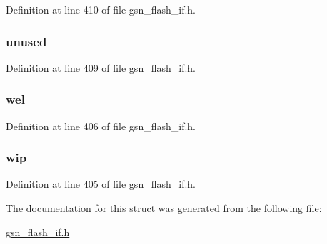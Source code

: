 Definition at line 410 of file gsn\_\-flash\_\-if.h.

\hypertarget{a00081_a2c3ace150ddcb10d297a6d30b67d6330}{
\subsubsection[{unused}]{ {\bf unused}}}
\label{a00081_a2c3ace150ddcb10d297a6d30b67d6330}


Definition at line 409 of file gsn\_\-flash\_\-if.h.

\hypertarget{a00081_a9373c12ea65b0c6a95c219ecd87449ce}{
\subsubsection[{wel}]{ {\bf wel}}}
\label{a00081_a9373c12ea65b0c6a95c219ecd87449ce}


Definition at line 406 of file gsn\_\-flash\_\-if.h.

\hypertarget{a00081_ab25d8b2ededb98f711b58b9a51b4c745}{
\subsubsection[{wip}]{ {\bf wip}}}
\label{a00081_ab25d8b2ededb98f711b58b9a51b4c745}


Definition at line 405 of file gsn\_\-flash\_\-if.h.



The documentation for this struct was generated from the following file:\begin{DoxyCompactItemize}
\item 
\hyperlink{a00501}{gsn\_\-flash\_\-if.h}\end{DoxyCompactItemize}
